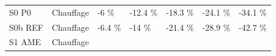 \documentclass[]{article}
\begin{document}
\begin{longtable}[]{@{}lllllll@{}}
\begin{minipage}[t]{0.14\columnwidth}
S0 P0\strut
\end{minipage} & \begin{minipage}[t]{0.13\columnwidth}\raggedright\strut
Chauffage\strut
\end{minipage} & \begin{minipage}[t]{0.11\columnwidth}\raggedright\strut
-6 \%\strut
\end{minipage} & \begin{minipage}[t]{0.11\columnwidth}\raggedright\strut
-12.4 \%\strut
\end{minipage} & \begin{minipage}[t]{0.11\columnwidth}\raggedright\strut
-18.3 \%\strut
\end{minipage} & \begin{minipage}[t]{0.11\columnwidth}\raggedright\strut
-24.1 \%\strut
\end{minipage} & \begin{minipage}[t]{0.11\columnwidth}\raggedright\strut
-34.1 \%\strut
\end{minipage}\tabularnewline
\begin{minipage}[t]{0.14\columnwidth}\raggedright\strut
S0b REF\strut
\end{minipage} & \begin{minipage}[t]{0.13\columnwidth}\raggedright\strut
Chauffage\strut
\end{minipage} & \begin{minipage}[t]{0.11\columnwidth}\raggedright\strut
-6.4 \%\strut
\end{minipage} & \begin{minipage}[t]{0.11\columnwidth}\raggedright\strut
-14 \%\strut
\end{minipage} & \begin{minipage}[t]{0.11\columnwidth}\raggedright\strut
-21.4 \%\strut
\end{minipage} & \begin{minipage}[t]{0.11\columnwidth}\raggedright\strut
-28.9 \%\strut
\end{minipage} & \begin{minipage}[t]{0.11\columnwidth}\raggedright\strut
-42.7 \%\strut
\end{minipage}\tabularnewline
\begin{minipage}[t]{0.14\columnwidth}\raggedright\strut
S1 AME\strut
\end{minipage} & \begin{minipage}[t]{0.13\columnwidth}\raggedright\strut
Chauffage\strut
\end{minipage} & \begin{minipage}[t]{0.11\columnwidth}\raggedright\strut

\end{minipage}
\end{longtable}
\end{document}
